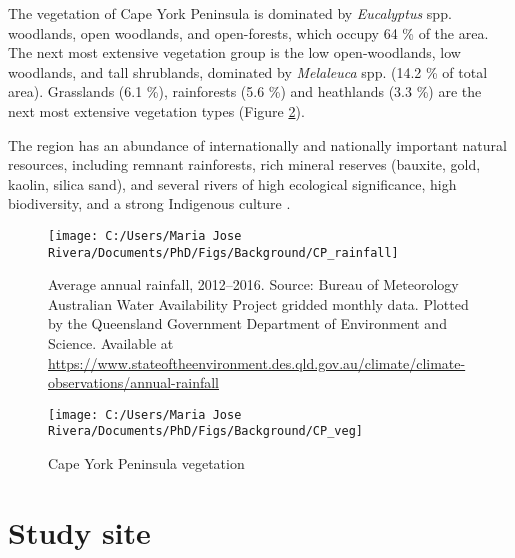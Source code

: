 \documentclass[
  12pt,
]{book}
\begin{document}
The vegetation of Cape York Peninsula is dominated by \emph{Eucalyptus} spp. woodlands, open woodlands, and open-forests, which occupy 64 \% of the area. The next most extensive vegetation group is the low open-woodlands, low woodlands, and tall shrublands, dominated by \emph{Melaleuca} spp. (14.2 \% of total area). Grasslands (6.1 \%), rainforests (5.6 \%) and heathlands (3.3 \%) are the next most extensive vegetation types \citep{neldnerVegetationSurveyMapping1995, foxVegetationAustralianTropical2001} (Figure \ref{fig:fig-veg-CP}).

The region has an abundance of internationally and nationally important natural resources, including remnant rainforests, rich mineral reserves (bauxite, gold, kaolin, silica sand), and several rivers of high ecological significance, high biodiversity, and a strong Indigenous culture \citep{hitchcockNaturalAttributesWorld2013}.

\begin{figure}

{\centering \texttt{[image: C:/Users/Maria Jose Rivera/Documents/PhD/Figs/Background/CP\_rainfall]} 

}

\caption{Average annual rainfall, 2012--2016. Source: Bureau of Meteorology Australian Water Availability Project gridded monthly data. Plotted by the Queensland Government Department of Environment and Science. Available at \url{https://www.stateoftheenvironment.des.qld.gov.au/climate/climate-observations/annual-rainfall}}\label{fig:fig-cli-CP}
\end{figure}



\begin{figure}

{\centering \texttt{[image: C:/Users/Maria Jose Rivera/Documents/PhD/Figs/Background/CP\_veg]} 

}

\caption{Cape York Peninsula vegetation}\label{fig:fig-veg-CP}
\end{figure}



\hypertarget{study-site}{%
\section{Study site}\label{study-site}}
\end{document}
